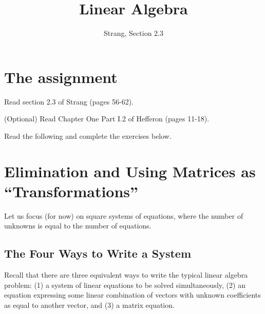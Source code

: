 \documentclass[11pt]{amsart}
\theoremstyle{definition}
\begin{document}
\title{Linear Algebra}
\author{Strang, Section 2.3}
\maketitle

\section{The assignment}
\begin{compactitem}
\item Read section 2.3 of Strang (pages 56-62).
\item (Optional) Read Chapter One Part I.2 of Hefferon (pages 11-18).
\item Read the following and complete the exercises below.
\end{compactitem}


\section{Elimination and Using Matrices as ``Transformations''}

Let us focus (for now) on square systems of equations, where the number of unknowns is equal to the number of equations.

\subsection*{The Four Ways to Write a System}

Recall that there are three equivalent ways to write the typical linear algebra problem: (1) a system of linear equations to be solved simultaneously, (2) an equation expressing some linear combination of vectors with unknown coefficients as equal to another vector, and (3) a matrix equation.
\end{document}
